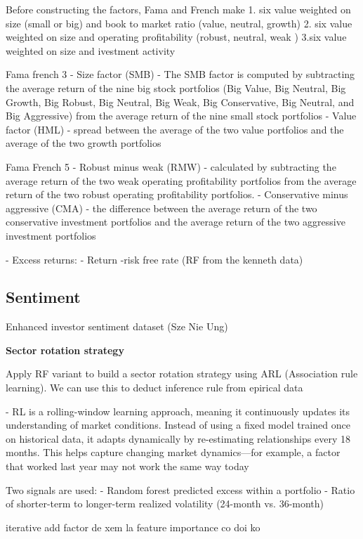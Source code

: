 Before constructing the factors, Fama and French make 
1. six value weighted on size (small or big) and book to market ratio (value, neutral, growth)
2. six value weighted on size and operating profitability (robust, neutral, weak )
3.six value weighted on size and ivestment activity

Fama french 3
- Size factor (SMB)
    - The SMB factor is computed by subtracting the average return of the nine big stock portfolios
    (Big Value, Big Neutral, Big Growth, Big Robust, Big Neutral, Big Weak, Big Conservative,
    Big Neutral, and Big Aggressive) from the average return of the nine small stock portfolios
- Value factor (HML)
    -  spread between the average of the two value portfolios and the average of the two growth portfolios

Fama French 5
- Robust minus weak (RMW)
    - calculated by subtracting the average return of the two
    weak operating profitability portfolios from the average return of the two robust operating
    profitability portfolios.
- Conservative minus aggressive (CMA)
    - the difference between the average return of
    the two conservative investment portfolios and the average return of the two aggressive
    investment portfolios 

- Excess returns:
    - Return -risk free rate (RF from the kenneth data)

\subsection{Sentiment}
Enhanced investor sentiment dataset (Sze Nie Ung)








\textbf{Sector rotation strategy}

Apply RF variant to build a sector rotation strategy using ARL (Association rule learning). We can use this to deduct inference rule from epirical data

- RL is a rolling-window learning approach, meaning it continuously updates its understanding of market conditions.
Instead of using a fixed model trained once on historical data, it adapts dynamically by re-estimating relationships every 18 months.
This helps capture changing market dynamics—for example, a factor that worked last year may not work the same way today

Two signals are used:
- Random forest predicted excess within a portfolio
- Ratio of shorter-term to longer-term realized volatility (24-month vs. 36-month)

iterative add factor de xem la feature importance co doi ko 